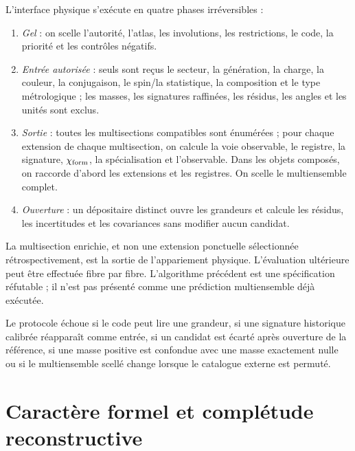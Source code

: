 \begin{algorithm}
\label{alg:asignacion-futura-sin-magnitudes}
L'interface physique s'exécute en quatre phases irréversibles :
\begin{enumerate}
 \item \emph{Gel} : on scelle l'autorité, l'atlas, les involutions,
 les restrictions, le code, la priorité et les contrôles négatifs.
 \item \emph{Entrée autorisée} : seuls sont reçus le secteur, la génération, la charge,
 la couleur, la conjugaison, le spin/la statistique, la composition et le type métrologique ;
 les masses, les signatures raffinées, les résidus, les angles et les unités sont exclus.
 \item \emph{Sortie} : toutes les multisections compatibles sont énumérées ; pour
 chaque extension de chaque multisection, on calcule la voie observable, le registre,
 la signature, \(\chi_{\rm form}\), la spécialisation et l'observable. Dans les objets
 composés, on raccorde d'abord les extensions et les registres. On scelle le
 multiensemble complet.
 \item \emph{Ouverture} : un dépositaire distinct ouvre les grandeurs et calcule
 les résidus, les incertitudes et les covariances sans modifier aucun candidat.
\end{enumerate}
\end{algorithm}

La multisection enrichie, et non une extension ponctuelle sélectionnée
rétrospectivement, est la sortie de l'appariement physique. L'évaluation
ultérieure peut être effectuée fibre par fibre. L'algorithme précédent est une
spécification réfutable ; il n'est pas présenté comme une prédiction multiensemble déjà
exécutée.

\begin{criterion}
\label{crit:fallo-protocolo-ciego}
Le protocole échoue si le code peut lire une grandeur, si une signature
historique calibrée réapparaît comme entrée, si un candidat est écarté après
ouverture de la référence, si une masse positive est confondue avec une masse exactement nulle
ou si le multiensemble scellé change lorsque le catalogue externe est permuté.
\end{criterion}

\section{Caractère formel et complétude reconstructive}
\label{sec:completitud-reconstructiva-torres}

